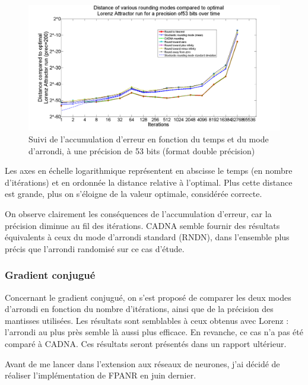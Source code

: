 \documentclass[a4paper,11pt]{article}
\begin{document}
\begin{figure}[h]
	\begin{center}
		\includegraphics[width=15cm]{distance_prec=53_logx}
		\caption{Suivi de l'accumulation d'erreur en fonction du temps et du mode d'arrondi, à une précision de 53 bits (format double précision)}
		\label{Lorenz}
	\end{center}
\end{figure}

Les axes en échelle logarithmique représentent en abscisse le temps (en nombre d'itérations) et en ordonnée la distance relative à l’optimal. Plus cette distance est grande, plus on s'éloigne de la valeur optimale, considérée correcte.

On observe clairement les conséquences de l’accumulation d’erreur, car la précision diminue au fil des itérations. 
CADNA semble fournir des résultats équivalents à ceux du mode d’arrondi standard (RNDN), dans l’ensemble plus précis que l’arrondi randomisé sur ce cas d'étude.

\subsubsection{Gradient conjugué}
Concernant le gradient conjugué, on s'est proposé de comparer les deux modes d’arrondi en fonction du nombre d’itérations, ainsi que de la précision des mantisses utilisées. Les résultats sont semblables à ceux obtenus avec Lorenz : l'arrondi au plus près semble là aussi plus efficace. En revanche, ce cas n'a pas été comparé à CADNA.
Ces résultats seront présentés dans un rapport ultérieur.

Avant de me lancer dans l’extension aux réseaux de neurones, j’ai décidé de réaliser l’implémentation de FPANR en juin dernier.
\end{document}
